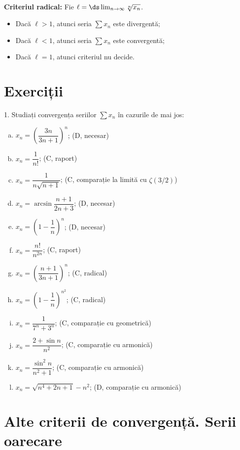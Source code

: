 \textbf{Criteriul radical:} Fie $ \ell = \ds\lim_{n \to \infty} \sqrt[n]{x_n} $.
\begin{itemize}
    \item Dacă $ \ell > 1 $, atunci seria $ \sum x_n $ este divergentă;
    \item Dacă $ \ell < 1 $, atunci seria $ \sum x_n $ este convergentă;
    \item Dacă $ \ell = 1 $, atunci criteriul nu decide.
\end{itemize}

\newpage
\section{Exerciții}

1. Studiați convergența seriilor $ \sum x_n $ în cazurile de mai jos:
\begin{enumerate}[(a)]
    \item $ x_n = \left( \dfrac{3n}{3n + 1} \right)^n $; \hfill(D, necesar)
    \item $ x_n = \dfrac{1}{n!} $; \hfill(C, raport)
    \item $ x_n = \dfrac{1}{n\sqrt{n + 1}} $; \hfill(C, comparație la limită cu $\zeta(3/2)$)
    \item $ x_n = \arcsin \dfrac{n+1}{2n + 3} $; \hfill(D, necesar)
    \item $ x_n = \left( 1 - \dfrac{1}{n} \right)^n $; \hfill(D, necesar)
    \item $ x_n = \dfrac{n!}{n^{2n}} $; \hfill(C, raport)
    \item $ x_n = \left( \dfrac{n + 1}{3n + 1}\right)^n $; \hfill(C, radical)
    \item $ x_n = \left( 1 - \dfrac{1}{n} \right)^{n^2} $; \hfill(C, radical)
    \item $ x_n = \dfrac{1}{7^n + 3^n} $; \hfill(C, comparație cu geometrică)
    \item $ x_n = \dfrac{2 + \sin n}{n^2} $; \hfill(C, comparație cu armonică)
    \item $ x_n = \dfrac{\sin^2 n}{n^2 + 1} $; \hfill(C, comparație cu armonică)
    \item $ x_n = \sqrt{n^4 + 2n + 1} - n^2 $; \hfill(D, comparație cu armonică)
\end{enumerate}


\section{Alte criterii de convergență. Serii oarecare}

